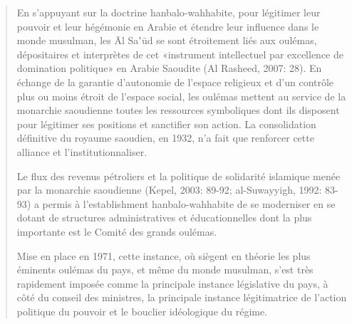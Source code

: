 \begin{quote}

En s'appuyant sur la doctrine hanbalo-wahhabite, pour légitimer leur
pouvoir et leur hégémonie en Arabie et étendre leur influence dans le
monde musulman, les Āl Sa‛ūd se sont étroitement liés aux oulémas,
dépositaires et interprètes de cet «instrument intellectuel par
excellence de domination politique» en Arabie Saoudite (Al Rasheed,
2007: 28). En échange de la garantie d'autonomie de l'espace religieux
et d'un contrôle plus ou moins étroit de l'espace social, les oulémas
mettent au service de la monarchie saoudienne toutes les ressources
symboliques dont ils disposent pour légitimer ses positions et
sanctifier son action. La consolidation définitive du royaume saoudien,
en 1932, n'a fait que renforcer cette alliance et l'institutionnaliser.

Le flux des revenus pétroliers et la politique de solidarité islamique
menée par la
monarchie saoudienne (Kepel, 2003: 89-92; al-Suwayyigh, 1992: 83-93) a
permis à l'establishment hanbalo-wahhabite de se moderniser en se dotant
de structures administratives et éducationnelles dont la plus importante
est le Comité des grands oulémas. 
\begin{Def}
Mise en place en 1971, cette instance,
où siègent en théorie les plus éminents oulémas du pays, et même du
monde musulman, s'est très rapidement imposée comme la principale
instance législative du pays, à côté du conseil des ministres, la
principale instance légitimatrice de l'action politique du pouvoir et le
bouclier idéologique du régime. 
\end{Def}


\end{quote}
